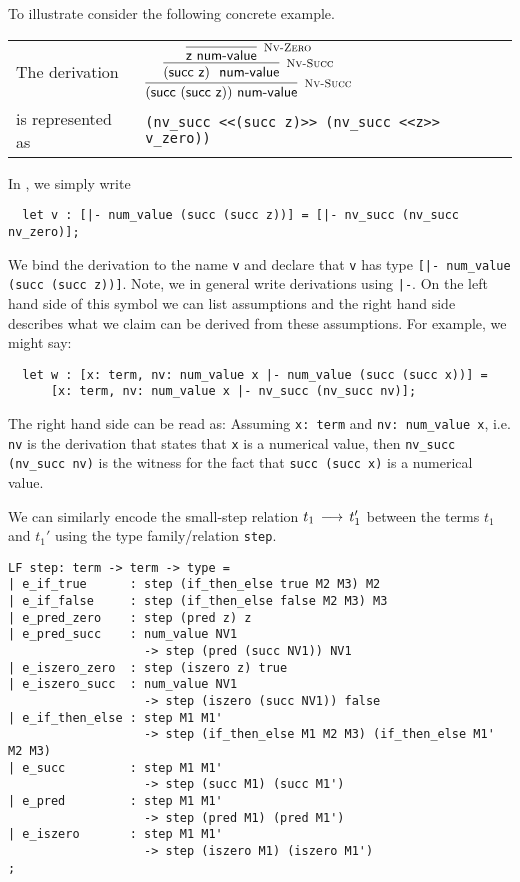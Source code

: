 To illustrate consider the following concrete example.\\[1em]

\begin{tabular}{l@{\qquad}l}
The derivation &
$
\infer[\NVSucc]
  { (\tmsucc (\tmsucc \tmzero)) \NumValue }
  { \infer[\NVSucc]
      { (\tmsucc \tmzero)~\NumValue }
      { \infer[\NVZero]
          {\tmzero \NumValue}
          {}
      }
  }
$\\[1em]
is represented as &
\lstinline!(nv_succ <<(succ z)>> (nv_succ <<z>> v_zero))!\\[1em]
\end{tabular}

In \beluga, we simply write

\begin{lstlisting}
  let v : [|- num_value (succ (succ z))] = [|- nv_succ (nv_succ nv_zero)];
\end{lstlisting}  



We bind the derivation to the name \lstinline!v!  and declare that \lstinline!v!
has type \lstinline![|- num_value (succ (succ z))]!.  Note,  we in general write
derivations using \lstinline!|-!.  On the left hand side  of this symbol  we can
list assumptions and the right hand side describes  what we claim can be derived
from these assumptions.  For example, we might say:

\begin{lstlisting}
  let w : [x: term, nv: num_value x |- num_value (succ (succ x))] =
      [x: term, nv: num_value x |- nv_succ (nv_succ nv)];
\end{lstlisting}

The  right  hand  side   can  be  read  as:   Assuming  \lstinline!x: term!  and
\lstinline!nv: num_value x!,  i.e. \lstinline!nv!  is the derivation that states
that \lstinline!x! is  a numerical value,  then \lstinline!nv_succ (nv_succ nv)!
is the witness for the fact that \lstinline!succ (succ x)! is a numerical value.

We can similarly  encode the small-step relation  $t_1 \mathrel{\,\longrightarrow\,} t_1'$  between the
terms $t_1$ and $t_1'$ using the type family/relation \lstinline!step!.

\begin{lstlisting}
LF step: term -> term -> type =
| e_if_true      : step (if_then_else true M2 M3) M2
| e_if_false     : step (if_then_else false M2 M3) M3
| e_pred_zero    : step (pred z) z
| e_pred_succ    : num_value NV1
                   -> step (pred (succ NV1)) NV1
| e_iszero_zero  : step (iszero z) true
| e_iszero_succ  : num_value NV1
                   -> step (iszero (succ NV1)) false
| e_if_then_else : step M1 M1'
                   -> step (if_then_else M1 M2 M3) (if_then_else M1' M2 M3)
| e_succ         : step M1 M1'
                   -> step (succ M1) (succ M1')
| e_pred         : step M1 M1'
                   -> step (pred M1) (pred M1')
| e_iszero       : step M1 M1'
                   -> step (iszero M1) (iszero M1')
;
\end{lstlisting}


